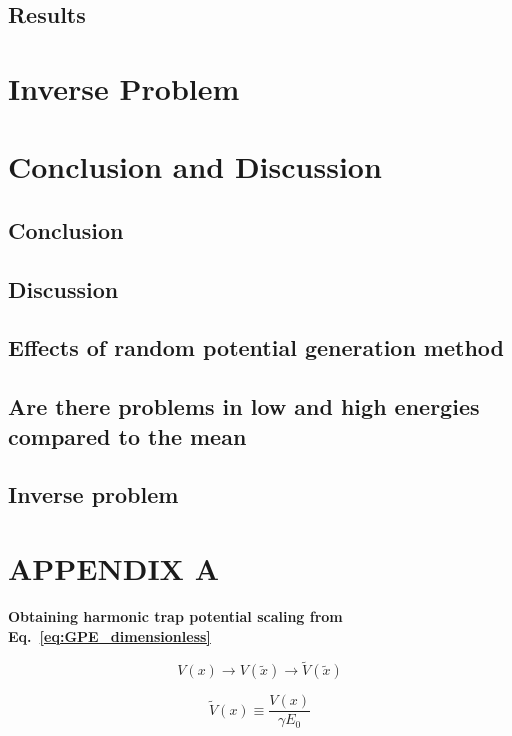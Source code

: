 \documentclass[a4paper,times,hidelinks,12pt]{article}
\begin{document}
\subsection{Results}

\section{Inverse Problem}

\clearpage
\section{Conclusion and Discussion}
\subsection{Conclusion}
\subsection{Discussion}
\subsection{Effects of random potential generation method}
\subsection{Are there problems in low and high energies compared to the mean}
\subsection{Inverse problem}


\clearpage

\clearpage




\appendix
\section{APPENDIX A}
\label{ap:scale}

\textbf{Obtaining harmonic trap potential scaling from Eq.~\eqref{eq:GPE_dimensionless}}

\begin{equation}
\label{eq:GPESCALE_harmonic_potential_transform}
    V(x) \rightarrow V(\widetilde{x}) \rightarrow \widetilde{V}(\widetilde{x})
\end{equation}

\begin{equation}
\label{eq:GPESCALE_dimensionless_harmonic_potential}
    \widetilde{V}(x) \equiv \frac{V(x)}{\gamma E_0}
\end{equation}
\end{document}
